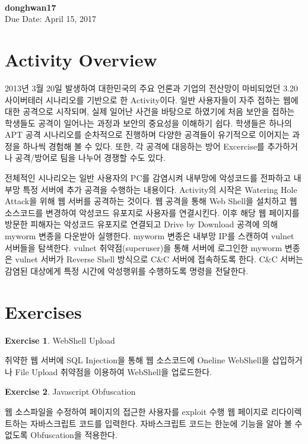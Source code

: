 \documentclass[a4paper, 11pt]{article}
\theoremstyle{definition}
\newtheorem{exercise}{Exercise}
\newtheorem{exercise solution}{Exercise Solution}
\begin{document}
 \\
         {\phantom{} \hfill \textbf{donghwan17}} \\
         {\phantom{} \hfill Due Date: April 15, 2017} \\

\section{Activity Overview}

2013년 3월 20일 발생하여 대한민국의 주요 언론과 기업의 전산망이 마비되었던 3.20 사이버테러\cite{320cyberattack} 시나리오를 기반으로 한 Activity이다. 일반 사용자들이 자주 접하는 웹에 대한 공격으로 시작되며, 실제 일어난 사건을 바탕으로 하였기에 처음 보안을 접하는 학생들도 공격이 일어나는 과정과 보안의 중요성을 이해하기 쉽다. 학생들은 하나의 APT 공격 시나리오를 순차적으로 진행하며 다양한 공격들이 유기적으로 이어지는 과정을 하나씩 경험해 볼 수 있다. 또한, 각 공격에 대응하는 방어 Excercise를 추가하거나 공격/방어로 팀을 나누어 경쟁할 수도 있다.

전체적인 시나리오는 일반 사용자의 PC를 감염시켜 내부망에 악성코드를 전파하고 내부망 특정 서버에 추가 공격을 수행하는 내용이다. Activity의 시작은 Watering Hole Attack을 위해 웹 서버를 공격하는 것이다. 웹 공격을 통해 Web Shell을 설치하고 웹 소스코드를 변경하여 악성코드 유포지로 사용자를 연결시킨다. 이후 해당 웹 페이지를 방문한 피해자는 악성코드 유포지로 연결되고 Drive by Download 공격에 의해 myworm 변종을 다운받아 실행한다. myworm 변종은 내부망 IP를 스캔하여 vulnet 서버들을 탐색한다. vulnet 취약점(superuser)을 통해 서버에 로그인한 myworm 변종은 vulnet 서버가 Reverse Shell 방식으로 C\&C 서버에 접속하도록 한다. C\&C 서버는 감염된 대상에게 특정 시간에 악성행위를 수행하도록 명령을 전달한다.

\section{Exercises}

\begin{exercise}
	WebShell Upload
	
	취약한 웹 서버에 SQL Injection을 통해 웹 소스코드에 Oneline WebShell을 삽입하거나 File Upload 취약점을 이용하여 WebShell을 업로드한다. 
\end{exercise}

\begin{exercise}
	Javascript Obfuscation
	
	웹 소스파일을 수정하여 페이지의 접근한 사용자를 exploit 수행 웹 페이지로 리다이렉트하는 자바스크립트 코드를 입력한다. 자바스크립트 코드는 한눈에 기능을 알아 볼 수 없도록 Obfuscation을 적용한다.	
\end{exercise}
\end{document}
